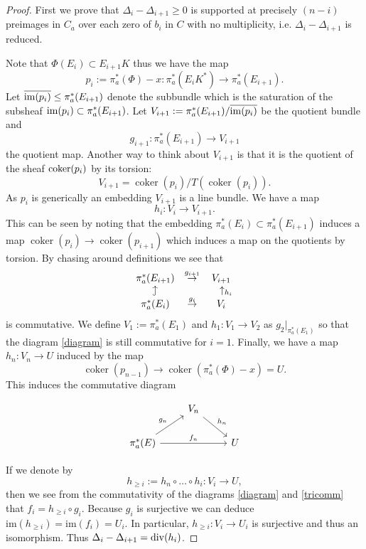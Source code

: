 \documentclass[12pt]{article}
\numberwithin{equation}{section}
\newcommand{\hookuparrow}{\mathrel{\rotatebox[origin=c]{90}{$\hookrightarrow$}}}
\renewcommand{\div}{{\rm div}}
\newcommand{\im}{{\rm im}}
\theoremstyle{remark}
\theoremstyle{definition}
\numberwithin{theorem}{section}
\def\beq{\begin{eqnarray}}
\def\eeq{\end{eqnarray}}
\DeclareMathOperator{\coker}{coker}
\renewcommand{\1}{\mathbbm{1}}
\begin{document}
\begin{proof}
	First we prove that $\Delta_i-\Delta_{i+1}\geq 0$ is supported at precisely $(n-i)$ preimages in $C_a$ over each zero of $b_i$ in $C$ with no multiplicity, i.e. $\Delta_i-\Delta_{i+1}$ is reduced.  
	
	Note that $\Phi(E_i)\subset E_{i+1}K$ thus we have the map $$p_i:=\pi_a^*(\Phi)-x:\pi_a^*(E_iK^*)\to \pi_a^*(E_{i+1}).$$ Let $\overline{\im(p_i)}\leq \pi_a^*(E_{i+1})$ denote the subbundle which is the saturation of the subsheaf $\im(p_i)\subset \pi_a^*(E_{i+1})$. Let $V_{i+1}:=\pi_a^*(E_{i+1})/\overline{\im(p_i)}$ be the quotient bundle and $$g_{i+1}:\pi_a^*(E_{i+1})\to V_{i+1}$$ the quotient map.  Another way to think about $V_{i+1}$ is that it is the quotient of the sheaf ${\rm coker}(p_i)$ by its torsion: $$V_{i+1}= \coker(p_i)/T(\coker(p_i)).$$ As $p_i$ is generically an embedding $V_{i+1}$ is a line bundle. We have a map $$h_i:V_{i}\to V_{i+1}.$$ This can be seen by  noting that the embedding $\pi_a^*(E_i)\subset \pi_a^*(E_{i+1})$ induces a map $\coker(p_i)\to \coker{(p_{i+1})}$ which induces a map on the quotients by torsion. By chasing around definitions we see that \beq \begin{array}{ccc} \pi_a^*(E_{i+1}) &\stackrel{g_{i+1}}{\to} &V_{i+1} \label{diagram} \\  \hookuparrow && \ \ \ \uparrow_{\scriptsize h_{i}} \\\pi_a^*(E_{i}) &\stackrel{g_{i}}{\to}  &V_{i}  \end{array}\eeq is commutative.
	We define $V_1:=\pi_a^*(E_1)$ and $h_1:V_1\to V_2$ as $g_{2}|_{\pi_a^*(E_1)}$ so that the diagram \eqref{diagram} is still commutative for $i=1$. Finally, we have a map $h_{n}:V_{n}\to U$ induced by the map $$\coker(p_{n-1})\to \coker(\pi_a^*(\Phi)-x)=U.$$  This induces the commutative diagram
	
	\beq \label{tricomm}
	\begin{tikzcd}
	& V_n \arrow{dr}{h_n} \\
	\pi_a^*(E) \arrow{ur}{g_n} \arrow{rr}{f_n} && U
	\end{tikzcd}
	\eeq
	
	If we denote by $$h_{\geq i}:=h_{n}\circ \dots \circ h_i : V_i\to U,$$ then we see from the commutativity of
	the diagrams \eqref{diagram} and \eqref{tricomm} that $f_i=h_{\geq i}\circ g_i$. Because $g_i$ is surjective we can deduce 
	 ${\mathrm{im}} (h_{\geq i})={\mathrm{im}}(f_i)=U_i.$ In particular, $h_{\geq i}:V_i\to U_i$ is surjective and thus an isomorphism. 
	 Thus $\Delta_i-\Delta_{i+1}=\div(h_i)$. 
	

\end{proof}
\end{document}
